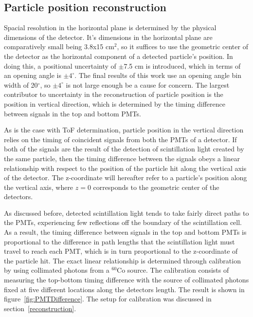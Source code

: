 \subsection{Particle position reconstruction}
Spacial resolution in the horizontal plane is determined by the physical dimensions of the detector.
It's dimensions in the horizontal plane are comparatively small being 3.8x15 cm$^2$, so it suffices to use the geometric center of the detector as the horizontal component of a detected particle's position.
In doing this, a positional uncertainty of $\pm$7.5 cm is introduced, which in terms of an opening angle is $\pm4^{\circ}$.
The final results of this work use an opening angle bin width of 20$^{\circ}$, so $\pm4^{\circ}$ is not large enough be a cause for concern.
The largest contributor to uncertainty in the reconstruction of particle position is the position in vertical direction, which is determined by the timing difference between signals in the top and bottom PMTs.

As is the case with ToF determination, particle position in the vertical direction relies on the timing of coincident signals from both the PMTs of a detector.
If both of the signals are the result of the detection of scintillation light created by the same particle, then the timing difference between the signals obeys a linear relationship with respect to the position of the particle hit along the vertical axis of the detector.
The z-coordinate will hereafter refer to a particle's position along the vertical axis, where $z=0$ corresponds to the geometric center of the detectors.

As discussed before, detected scintillation light tends to take fairly direct paths to the PMTs, experiencing few reflections off the boundary of the scintillation cell.
As a result, the timing difference between signals in the top and bottom PMTs is proportional to the difference in path lengths that the scintillation light must travel to reach each PMT, which is in turn proportional to the z-coordinate of the particle hit.
The exact linear relationship is determined through calibration by using collimated photons from a $^{60}$Co source.
The calibration consists of measuring the top-bottom timing difference with the source of collimated photons fixed at five different locations along the detectors length.
The result is shown in figure~\ref{fig:PMTDifference}.
The setup for calibration was discussed in section~\ref{reconstruction}.

